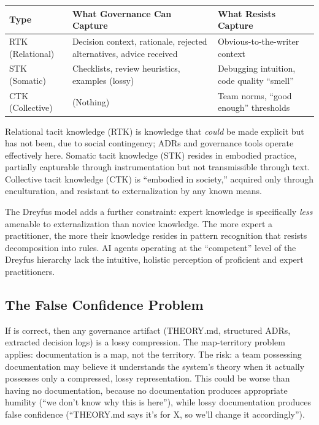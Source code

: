 \documentclass[11pt, a4paper, logo, copyright]{googledeepmind}
\begin{document}
\begin{center}
\begin{tabular}{lp{5cm}p{5cm}}
\toprule
Type & What Governance Can Capture & What Resists Capture \\
\midrule
RTK (Relational) & Decision context, rationale, rejected alternatives, advice received & Obvious-to-the-writer context \\
STK (Somatic) & Checklists, review heuristics, examples (lossy) & Debugging intuition, code quality ``smell'' \\
CTK (Collective) & (Nothing) & Team norms, ``good enough'' thresholds \\
\bottomrule
\end{tabular}
\end{center}

Relational tacit knowledge (RTK) is knowledge that \emph{could} be made explicit but has not been, due to social contingency; ADRs and governance tools operate effectively here. Somatic tacit knowledge (STK) resides in embodied practice, partially capturable through instrumentation but not transmissible through text. Collective tacit knowledge (CTK) is ``embodied in society,'' acquired only through enculturation, and resistant to externalization by any known means.

The Dreyfus model adds a further constraint: expert knowledge is specifically \emph{less} amenable to externalization than novice knowledge. The more expert a practitioner, the more their knowledge resides in pattern recognition that resists decomposition into rules. AI agents operating at the ``competent'' level of the Dreyfus hierarchy lack the intuitive, holistic perception of proficient and expert practitioners.

\subsection{The False Confidence Problem}

If \citet{naur1985} is correct, then any governance artifact (THEORY.md, structured ADRs, extracted decision logs) is a lossy compression. The map-territory problem applies: documentation is a map, not the territory. The risk: a team possessing documentation may believe it understands the system's theory when it actually possesses only a compressed, lossy representation. This could be worse than having no documentation, because no documentation produces appropriate humility (``we don't know why this is here''), while lossy documentation produces false confidence (``THEORY.md says it's for X, so we'll change it accordingly'').
\end{document}
